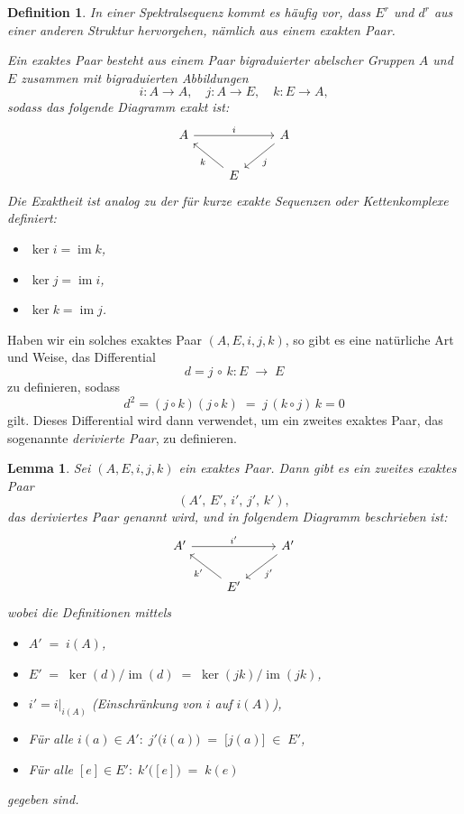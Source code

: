 \documentclass[12pt, hidelinks]{article}
\numberwithin{conj}{section}
\newtheorem{definition}[conj]{Definition}
\newtheorem{lemma}[conj]{Lemma}
\newcommand{\ima}{\operatorname{im}}
\begin{document}
\begin{definition}
    In einer Spektralsequenz kommt es häufig vor, dass $E^r$ und $d^r$ aus einer anderen Struktur hervorgehen, nämlich aus einem \emph{exakten Paar}.

    Ein \emph{exaktes Paar} besteht aus einem Paar bigraduierter abelscher Gruppen $A$ und $E$ zusammen mit bigraduierten Abbildungen
    \[
        i : A \to A,
        \quad
        j : A \to E,
        \quad
        k : E \to A,
    \]
    sodass das folgende Diagramm exakt ist:
    \[
    \begin{tikzcd}
        A && A \\
        & E
        \arrow["i", from=1-1, to=1-3]
        \arrow["j", from=1-3, to=2-2]
        \arrow["k", from=2-2, to=1-1]
    \end{tikzcd}
    \]
    Die \emph{Exaktheit} ist analog zu der für kurze exakte Sequenzen oder Kettenkomplexe definiert:
    \begin{itemize}[nolistsep]
        \item $\ker i = \ima k$,
        \item $\ker j = \ima i$,
        \item $\ker k = \ima j$.
    \end{itemize}
\end{definition}

Haben wir ein solches exaktes Paar $(A,E,i,j,k)$, so gibt es eine natürliche Art und Weise, das Differential
\[
    d = j \,\circ\, k : E \;\longrightarrow\; E
\]
zu definieren, sodass
\[
    d^2 = (j \circ k)(j \circ k) \;=\; j\,(k \circ j)\,k = 0
\]
gilt. Dieses Differential wird dann verwendet, um ein zweites exaktes Paar, das sogenannte \emph{derivierte Paar}, zu definieren.

\begin{lemma}
    Sei $(A,E,i,j,k)$ ein exaktes Paar. Dann gibt es ein zweites exaktes Paar
    \[
        (A',\,E',\,i',\,j',\,k'),
    \]
    das \emph{deriviertes Paar} genannt wird, und in folgendem Diagramm beschrieben ist:
    \[
    \begin{tikzcd}
        A' && A' \\
        & E'
        \arrow["i'", from=1-1, to=1-3]
        \arrow["j'", from=1-3, to=2-2]
        \arrow["k'", from=2-2, to=1-1]
    \end{tikzcd}
    \]
    wobei die Definitionen mittels
    \begin{itemize}[nolistsep]
        \item $A' \;=\; i(A)$,
        \item $E' \;=\; \ker(d)\big/\ima(d) \;=\; \ker(jk)\big/\ima(jk)$,
        \item $i' = i\vert_{i(A)}$ (Einschränkung von $i$ auf $i(A)$),
        \item Für alle $i(a) \in A':\; j'\bigl(i(a)\bigr) \;=\; \bigl[j(a)\bigr] \;\in\; E'$,
        \item Für alle $[e] \in E':\; k'\bigl([e]\bigr) \;=\; k(e)$
    \end{itemize}
    gegeben sind.
\end{lemma}
\end{document}
